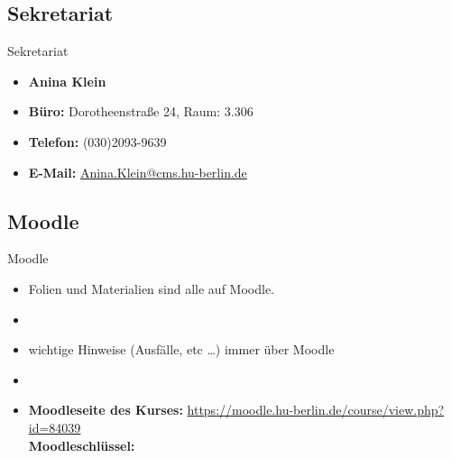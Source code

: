 %
\subsection{Sekretariat}

\begin{frame}{Sekretariat}
	
\begin{itemize}
	\item[] \textbf{Anina Klein}	
	\item \textbf{Büro:} Dorotheenstraße 24, Raum: 3.306
	\item \textbf{Telefon:} (030)2093-9639
	\item \textbf{E-Mail:} \href{mailto:Anina.Klein@cms.hu-berlin.de}{Anina.Klein@cms.hu-berlin.de}
\end{itemize}	

\end{frame}



%
\subsection{Moodle}	

\begin{frame}{Moodle}

\begin{itemize}
	\item Folien und Materialien sind alle auf Moodle.
	\item[]
	\item wichtige Hinweise (Ausfälle, etc \dots) immer über Moodle
	\item[]
	\item \textbf{Moodleseite des Kurses:} \url{https://moodle.hu-berlin.de/course/view.php?id=84039}\\
	\textbf{Moodleschlüssel:} %
\end{itemize}		

\end{frame}


